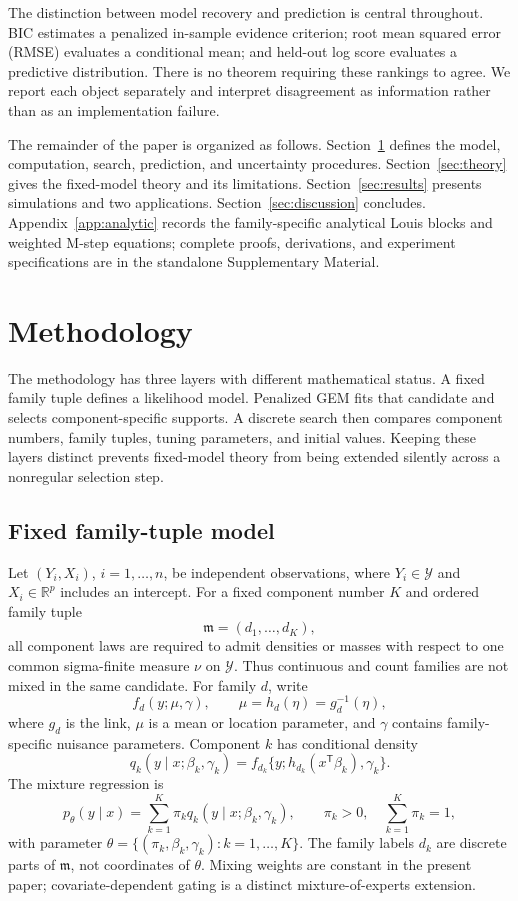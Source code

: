 \documentclass[a4paper,fleqn]{cas-sc}
\newcommand{\R}{\mathbb R}
\newcommand{\T}{\mathsf T}
\newcommand{\model}{\mathfrak m}
\begin{document}
The distinction between model recovery and prediction is central throughout. BIC estimates a penalized in-sample evidence criterion; root mean squared error (RMSE) evaluates a conditional mean; and held-out log score evaluates a predictive distribution. There is no theorem requiring these rankings to agree. We report each object separately and interpret disagreement as information rather than as an implementation failure.

The remainder of the paper is organized as follows. Section~\ref{sec:methods} defines the model, computation, search, prediction, and uncertainty procedures. Section~\ref{sec:theory} gives the fixed-model theory and its limitations. Section~\ref{sec:results} presents simulations and two applications. Section~\ref{sec:discussion} concludes. Appendix~\ref{app:analytic} records the family-specific analytical Louis blocks and weighted M-step equations; complete proofs, derivations, and experiment specifications are in the standalone Supplementary Material.

\section{Methodology}
\label{sec:methods}

The methodology has three layers with different mathematical status. A fixed family tuple defines a likelihood model. Penalized GEM fits that candidate and selects component-specific supports. A discrete search then compares component numbers, family tuples, tuning parameters, and initial values. Keeping these layers distinct prevents fixed-model theory from being extended silently across a nonregular selection step.

\subsection{Fixed family-tuple model}
\label{sec:model}

Let $(Y_i,X_i)$, $i=1,\ldots,n$, be independent observations, where $Y_i\in\mathcal Y$ and $X_i\in\R^p$ includes an intercept. For a fixed component number $K$ and ordered family tuple
\[
  \model=(d_1,\ldots,d_K),
\]
all component laws are required to admit densities or masses with respect to one common sigma-finite measure $\nu$ on $\mathcal Y$. Thus continuous and count families are not mixed in the same candidate. For family $d$, write
\[
  f_d(y;\mu,\gamma),\qquad \mu=h_d(\eta)=g_d^{-1}(\eta),
\]
where $g_d$ is the link, $\mu$ is a mean or location parameter, and $\gamma$ contains family-specific nuisance parameters. Component $k$ has conditional density
\[
  q_k(y\mid x;\beta_k,\gamma_k)
  =f_{d_k}\{y;h_{d_k}(x^\T\beta_k),\gamma_k\}.
\]
The mixture regression is
\begin{equation}
  p_\theta(y\mid x)=\sum_{k=1}^K\pi_k q_k(y\mid x;\beta_k,\gamma_k),
  \qquad \pi_k>0,\quad \sum_{k=1}^K\pi_k=1,
  \label{eq:model}
\end{equation}
with parameter $\theta=\{(\pi_k,\beta_k,\gamma_k):k=1,\ldots,K\}$. The family labels $d_k$ are discrete parts of $\model$, not coordinates of $\theta$. Mixing weights are constant in the present paper; covariate-dependent gating is a distinct mixture-of-experts extension.
\end{document}
